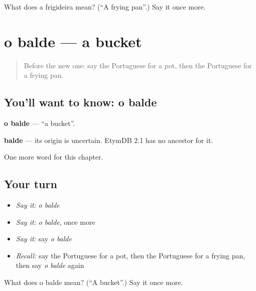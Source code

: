 \begin{tcolorbox}[breakable,colback=teal!4,colframe=teal!35!black,title={Before you move on}]
What does a frigideira mean? (\textquotedblleft{}A frying pan\textquotedblright{}.) Say it once more.
\end{tcolorbox}
\section[o balde]{o balde — a bucket}

\label{lesson:PT-C97-balde}



\begin{quote}
Before the new one: say the Portuguese for a pot, then the Portuguese for a frying pan.
\end{quote}

\subsection*{You'll want to know: o balde}
\textbf{o balde} — \textquotedblleft{}a bucket\textquotedblright{}.

\begin{cousinweb}
\textbf{balde} — its origin is uncertain. EtymDB 2.1 has no ancestor for it.
\end{cousinweb}

\begin{grammarlens}[title={What you've built}]
One more word for this chapter.
\end{grammarlens}

\subsection*{Your turn}
\begin{itemize}
\raggedright
  \item \emph{Say it:} \emph{o balde}
  \item \emph{Say it:} \emph{o balde}, once more
  \item \emph{Say it:} say \emph{o balde}
  \item \emph{Recall:} say the Portuguese for a pot, then the Portuguese for a frying pan, then say \emph{o balde} again
\end{itemize}

\begin{tcolorbox}[breakable,colback=teal!4,colframe=teal!35!black,title={Before you move on}]
What does o balde mean? (\textquotedblleft{}A bucket\textquotedblright{}.) Say it once more.
\end{tcolorbox}
